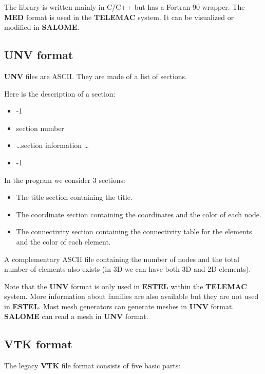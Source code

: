 \documentclass[a4paper,10pt]{article}
\newcommand{\tel}{\textbf{TELEMAC}\xspace}
\newcommand{\estel}{\textbf{ESTEL}\xspace}
\newcommand{\sal}{\textbf{SALOME}\xspace}
\newcommand{\unv}{\textbf{UNV}\xspace}
\newcommand{\med}{\textbf{MED}\xspace}
\newcommand{\vtk}{\textbf{VTK}\xspace}
\begin{document}
The library is written mainly in C/C++ but has a Fortran 90 wrapper.
The \med format is used in the \tel system. It can be visualized or modified in \sal.

\subsection{\unv format\cite{unv}}

\unv files are ASCII. They are made of a list of sections.

Here is the description of a section:

\begin{itemize}
\setlength{\itemsep}{1pt}
\setlength{\parskip}{0pt}
\setlength{\parsep}{0pt}
\item -1
\item section number
\item \ldots section information \ldots
\item -1
\end{itemize}
In the program we consider 3 sections:
\begin{itemize}
\setlength{\itemsep}{1pt}
\setlength{\parskip}{0pt}
\setlength{\parsep}{0pt}
\item The title section containing the title.
\item The coordinate section containing the coordinates and the color of each
node.
\item The connectivity section containing the connectivity table for the
elements and the color of each element.
\end{itemize}

A complementary ASCII file containing the number of nodes and the total number
of elements also exists (in 3D we can have both 3D and 2D elements). 

Note that the \unv format is only used in \estel within the \tel system.
More information about families are also available but they are not used in
\estel.
Most mesh generators can generate meshes in \unv format.
\sal can read a mesh in \unv format.

\subsection{\vtk format\cite{vtk}}

The legacy \vtk file format consists of five basic parts:
\end{document}
